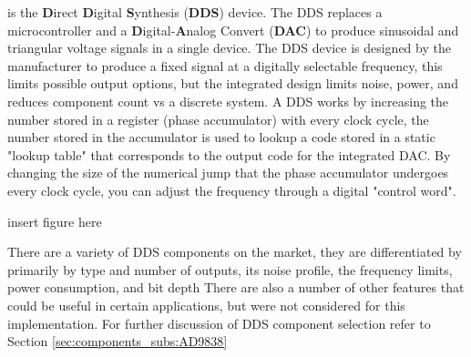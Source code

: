  is the {\bf D}irect {\bf D}igital {\bf S}ynthesis ({\bf DDS}) device. The DDS replaces a microcontroller and a {\bf D}igital-{\bf A}nalog Convert ({\bf DAC}) to produce sinusoidal and triangular voltage signals in a single device.  The DDS device is designed by the manufacturer to produce a fixed signal at a digitally selectable frequency, this limits possible output options, but the integrated design limits noise, power, and reduces component count vs a discrete system. A DDS works by increasing the number stored in a register (phase accumulator) with every clock cycle, the number stored in the accumulator is used to lookup a code stored in a static "lookup table" that corresponds to the output code for the integrated DAC. By changing the size of the numerical jump that the phase accumulator undergoes every clock cycle, you can adjust the frequency through a digital "control word". 

\begin{marginfigure}
insert figure here

\end{marginfigure}



There are a variety of DDS components on the market, they are differentiated by primarily by type and number of outputs, its noise profile, the frequency limits, power consumption, and bit depth  There are also a number of other features that could be useful in certain applications, but were not considered for this implementation. For further discussion of DDS component selection refer to Section \ref{sec:components_subs:AD9838} 

